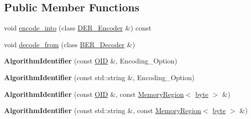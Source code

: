 \subsection*{Public Member Functions}
\begin{DoxyCompactItemize}
\item 
void \hyperlink{classBotan_1_1AlgorithmIdentifier_a65da42cd3c9dc2b5a0b6ac4af9b807ae}{encode\-\_\-into} (class \hyperlink{classBotan_1_1DER__Encoder}{D\-E\-R\-\_\-\-Encoder} \&) const 
\item 
void \hyperlink{classBotan_1_1AlgorithmIdentifier_a4bb685225ada707de97e7c584212ac76}{decode\-\_\-from} (class \hyperlink{classBotan_1_1BER__Decoder}{B\-E\-R\-\_\-\-Decoder} \&)
\item 
\hypertarget{classBotan_1_1AlgorithmIdentifier_ac61d8e17d943fbdc9871106f6edc0c3f}{{\bfseries Algorithm\-Identifier} (const \hyperlink{classBotan_1_1OID}{O\-I\-D} \&, Encoding\-\_\-\-Option)}\label{classBotan_1_1AlgorithmIdentifier_ac61d8e17d943fbdc9871106f6edc0c3f}

\item 
\hypertarget{classBotan_1_1AlgorithmIdentifier_a5f6d21bb5b79abb1f04c1b84eb645e63}{{\bfseries Algorithm\-Identifier} (const std\-::string \&, Encoding\-\_\-\-Option)}\label{classBotan_1_1AlgorithmIdentifier_a5f6d21bb5b79abb1f04c1b84eb645e63}

\item 
\hypertarget{classBotan_1_1AlgorithmIdentifier_a2fa5f77f86ec08aa74ef96ec5a5743f2}{{\bfseries Algorithm\-Identifier} (const \hyperlink{classBotan_1_1OID}{O\-I\-D} \&, const \hyperlink{classBotan_1_1MemoryRegion}{Memory\-Region}$<$ \hyperlink{namespaceBotan_a7d793989d801281df48c6b19616b8b84}{byte} $>$ \&)}\label{classBotan_1_1AlgorithmIdentifier_a2fa5f77f86ec08aa74ef96ec5a5743f2}

\item 
\hypertarget{classBotan_1_1AlgorithmIdentifier_ae6e3350e5e907cdbea1184b4e57f1659}{{\bfseries Algorithm\-Identifier} (const std\-::string \&, const \hyperlink{classBotan_1_1MemoryRegion}{Memory\-Region}$<$ \hyperlink{namespaceBotan_a7d793989d801281df48c6b19616b8b84}{byte} $>$ \&)}\label{classBotan_1_1AlgorithmIdentifier_ae6e3350e5e907cdbea1184b4e57f1659}

\end{DoxyCompactItemize}
